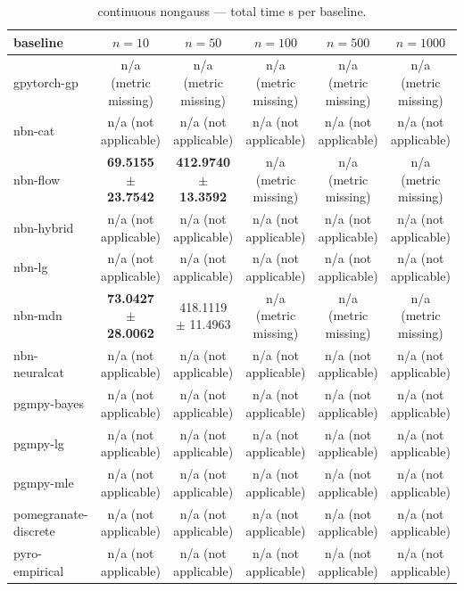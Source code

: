 \begin{table}[h]
\centering
\caption{continuous nongauss — total time s per baseline.}
\label{tab:continuous_nongauss_total_time_s}
\begin{tabular}{lccccc}
\toprule
baseline & $n=10$ & $n=50$ & $n=100$ & $n=500$ & $n=1000$ \\
\midrule
gpytorch-gp & n/a (metric missing) & n/a (metric missing) & n/a (metric missing) & n/a (metric missing) & n/a (metric missing) \\
nbn-cat & n/a (not applicable) & n/a (not applicable) & n/a (not applicable) & n/a (not applicable) & n/a (not applicable) \\
nbn-flow & \textbf{69.5155 $\pm$ 23.7542} & \textbf{412.9740 $\pm$ 13.3592} & n/a (metric missing) & n/a (metric missing) & n/a (metric missing) \\
nbn-hybrid & n/a (not applicable) & n/a (not applicable) & n/a (not applicable) & n/a (not applicable) & n/a (not applicable) \\
nbn-lg & n/a (not applicable) & n/a (not applicable) & n/a (not applicable) & n/a (not applicable) & n/a (not applicable) \\
nbn-mdn & \textbf{73.0427 $\pm$ 28.0062} & 418.1119 $\pm$ 11.4963 & n/a (metric missing) & n/a (metric missing) & n/a (metric missing) \\
nbn-neuralcat & n/a (not applicable) & n/a (not applicable) & n/a (not applicable) & n/a (not applicable) & n/a (not applicable) \\
pgmpy-bayes & n/a (not applicable) & n/a (not applicable) & n/a (not applicable) & n/a (not applicable) & n/a (not applicable) \\
pgmpy-lg & n/a (not applicable) & n/a (not applicable) & n/a (not applicable) & n/a (not applicable) & n/a (not applicable) \\
pgmpy-mle & n/a (not applicable) & n/a (not applicable) & n/a (not applicable) & n/a (not applicable) & n/a (not applicable) \\
pomegranate-discrete & n/a (not applicable) & n/a (not applicable) & n/a (not applicable) & n/a (not applicable) & n/a (not applicable) \\
pyro-empirical & n/a (not applicable) & n/a (not applicable) & n/a (not applicable) & n/a (not applicable) & n/a (not applicable) \\
\bottomrule
\end{tabular}
\end{table}

